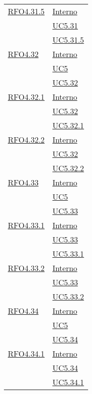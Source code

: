 \begin{longtable}{|>{\centering}m{5cm}|m{5cm}<{\centering}|}
\hyperlink{RFO4.31.5}{RFO4.31.5} & \hyperlink{Interno}{Interno}\\ &\hyperref[UC5.31]{UC5.31}\\ &\hyperref[UC5.31.5]{UC5.31.5}\\ \hline

\hyperlink{RFO4.32}{RFO4.32} &  \hyperlink{Interno}{Interno}\\ &\hyperref[UC5]{UC5}\\ &\hyperref[UC5.32]{UC5.32}\\ \hline

\hyperlink{RFO4.32.1}{RFO4.32.1} & \hyperlink{Interno}{Interno}\\ &\hyperref[UC5.32]{UC5.32}\\ &\hyperref[UC5.32.1]{UC5.32.1}\\ \hline

\hyperlink{RFO4.32.2}{RFO4.32.2} &  \hyperlink{Interno}{Interno}\\ &\hyperref[UC5.32]{UC5.32}\\ &\hyperref[UC5.32.2]{UC5.32.2}\\ \hline

\hyperlink{RFO4.33}{RFO4.33} & \hyperlink{Interno}{Interno}\\ &\hyperref[UC5]{UC5}\\ &\hyperref[UC5.33]{UC5.33}\\ \hline

\hyperlink{RFO4.33.1}{RFO4.33.1} & \hyperlink{Interno}{Interno}\\ &\hyperref[UC5.33]{UC5.33}\\ &\hyperref[UC5.33.1]{UC5.33.1}\\ \hline

\hyperlink{RFO4.33.2}{RFO4.33.2} &  \hyperlink{Interno}{Interno}\\ &\hyperref[UC5.33]{UC5.33}\\ &\hyperref[UC5.33.2]{UC5.33.2}\\ \hline

\hyperlink{RFO4.34}{RFO4.34} &  \hyperlink{Interno}{Interno}\\ &\hyperref[UC5]{UC5}\\ &\hyperref[UC5.34]{UC5.34}\\ \hline

\hyperlink{RFO4.34.1}{RFO4.34.1} & \hyperlink{Interno}{Interno}\\ &\hyperref[UC5.34]{UC5.34}\\ &\hyperref[UC5.34.1]{UC5.34.1}\\ \hline


\end{longtable}
